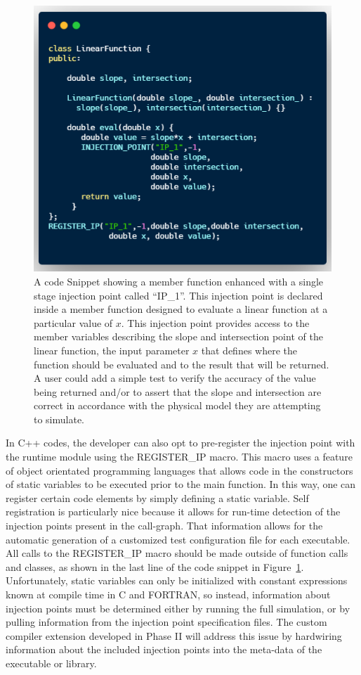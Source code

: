 \begin{figure}
 \includegraphics[width=\textwidth]{./Figures/linear-func.png}
 \caption{A code Snippet showing a member function enhanced with a single stage injection point called ``IP\_1''. This injection point is declared inside a member function 
 designed to evaluate a linear function at a particular value of $x$. This injection point provides access to the member variables describing the slope and intersection point
 of the linear function, the input parameter $x$ that defines where the function should be evaluated and to the result that will be returned. A user could add a simple test to 
 verify the accuracy of the value being returned and/or to assert that the slope and intersection are correct in accordance with the physical model they are attempting to simulate. 
 \label{ip_example}}
\end{figure}

In C++ codes, the developer can also opt to pre-register the injection point with the runtime module using the REGISTER\_IP macro. This macro uses a feature of object orientated programming languages that allows code in the constructors of static variables to be executed prior to the main function. In this way, one can register certain code elements by simply defining a static variable. Self registration is particularly nice because it allows for run-time detection of the injection points present in the call-graph. That information allows for the automatic generation of a customized test configuration file for each executable. All calls to the REGISTER\_IP macro should be made outside of function calls and classes, as shown in the last line of the code snippet in Figure~\ref{ip_example}. Unfortunately, static variables can only be initialized with constant expressions known at compile time in C and FORTRAN, so instead, information about injection points must be determined either by running the full simulation, or by pulling information from the injection point specification files. The custom compiler extension developed in Phase II will address this issue by hardwiring information about the included injection points into the meta-data of the executable or library. 

